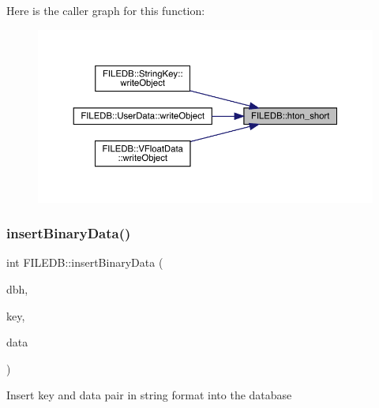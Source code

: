 Here is the caller graph for this function\+:\nopagebreak
\begin{figure}[H]
\begin{center}
\leavevmode
\includegraphics[width=350pt]{d2/de6/namespaceFILEDB_acbb57ab648e150c1950a7e6a67a6aa56_icgraph}
\end{center}
\end{figure}
\mbox{\label{namespaceFILEDB_a517749615adc5aa798175fb429115366}} 
\subsubsection{\texorpdfstring{insertBinaryData()}{insertBinaryData()}}
{\footnotesize\ttfamily int F\+I\+L\+E\+D\+B\+::insert\+Binary\+Data (\begin{DoxyParamCaption}\item[{\mbox{\hyperlink{other__libs_2filedb_2filehash_2ffdb__db_8h_a0b27b956926453a7a8141ea8e10f0df8}{F\+F\+D\+B\+\_\+\+DB}} $\ast$}]{dbh,  }\item[{const std\+::string \&}]{key,  }\item[{const std\+::string \&}]{data }\end{DoxyParamCaption})}

Insert key and data pair in string format into the database


